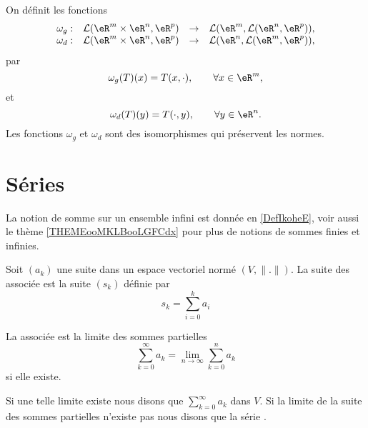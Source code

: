 \begin{proposition}\label{isom_isom}
	On définit les fonctions
	\begin{equation}
		\begin{array}{rccc}
			\omega_g: & \mathcal{L}(\eR^{m}\times\eR^{n}, \eR^p) & \to & \mathcal{L}(\eR^{m}, \mathcal{L}(\eR^{n}, \eR^p)), \\
			\omega_d: & \mathcal{L}(\eR^{m}\times\eR^{n}, \eR^p) & \to & \mathcal{L}(\eR^{n}, \mathcal{L}(\eR^{m}, \eR^p)),
		\end{array}
	\end{equation}
	par
	\[
		\omega_g(T)(x)=T(x,\cdot), \qquad \forall x\in\eR^m,
	\]
	et
	\[
		\omega_d(T)(y)=T(\cdot, y), \qquad \forall y\in\eR^n.
	\]
	Les fonctions \( \omega_g\) et \( \omega_d\) sont des isomorphismes qui préservent les normes.
\end{proposition}

\section{Séries}
\label{SECooYCQBooSZNXhd}

La notion de somme sur un ensemble infini est donnée en \ref{DefIkoheE}, voir aussi le thème \ref{THEMEooMKLBooLGFCdx} pour plus de notions de sommes finies et infinies.
\begin{definition}      \label{DefGFHAaOL}
	Soit \( (a_k)\) une suite dans un espace vectoriel normé \( (V,\| . \| )\). La suite des  associée est la suite \( (s_k)\) définie par
	\begin{equation}
		s_k=\sum_{i=0}^ka_i
	\end{equation}


	La  associée est la limite des sommes partielles
	\begin{equation}
		\sum_{k=0}^{\infty}a_k=\lim_{n\to \infty} \sum_{k=0}^na_k
	\end{equation}
	si elle existe.

	Si une telle limite existe nous disons que \( \sum_{k=0}^{\infty}a_k\)  dans \( V\). Si la limite de la suite des sommes partielles n'existe pas nous disons que la série .
\end{definition}

